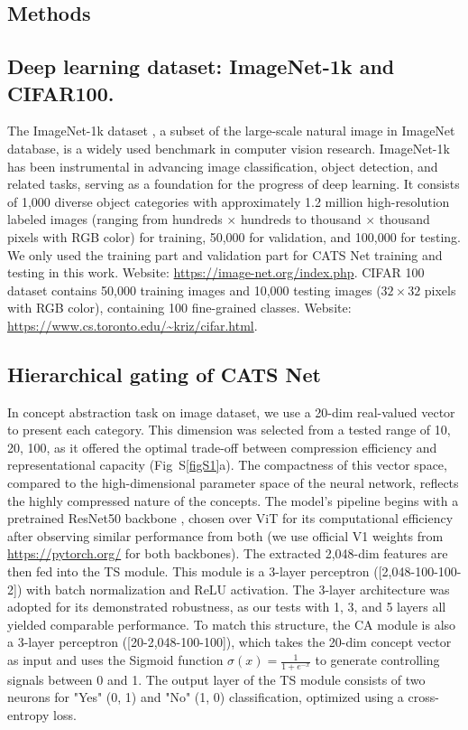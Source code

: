 \documentclass[pdflatex,sn-mathphys-num,lineno]{sn-jnl}%
\begin{document}
\begin{CJK}{UTF8}{gbsn}
\section{Methods}
\subsection{Deep learning dataset: ImageNet-1k and CIFAR100.} The ImageNet-1k dataset \cite{deng_imagenet_2009}, a subset of the large-scale natural image in ImageNet database, is a widely used benchmark in computer vision research. ImageNet-1k has been instrumental in advancing image classification, object detection, and related tasks, serving as a foundation for the progress of deep learning. It consists of 1,000 diverse object categories with approximately 1.2 million high-resolution labeled images (ranging from hundreds $\times$ hundreds to thousand $\times$ thousand pixels with RGB color) for training, 50,000 for validation, and 100,000 for testing. We only used the training part and validation part for CATS Net training and testing in this work. Website: \url{https://image-net.org/index.php}. CIFAR 100 dataset \cite{krizhevsky_learning_2009} contains 50,000 training images and 10,000 testing images ($32\times32$ pixels with RGB color), containing 100 fine-grained classes. Website: \url{https://www.cs.toronto.edu/~kriz/cifar.html}.

\subsection{Hierarchical gating of CATS Net}
In concept abstraction task on image dataset, we use a 20-dim real-valued vector to present each category. This dimension was selected from a tested range of {10, 20, 100}, as it offered the optimal trade-off between compression efficiency and representational capacity (Fig~S\ref{figS1}a). The compactness of this vector space, compared to the high-dimensional parameter space of the neural network, reflects the highly compressed nature of the concepts. The model's pipeline begins with a pretrained ResNet50 backbone \cite{he_deep_2016}, chosen over ViT \cite{dosovitskiy_image_2021} for its computational efficiency after observing similar performance from both (we use official V1 weights from \url{https://pytorch.org/} for both backbones). The extracted 2,048-dim features are then fed into the TS module. This module is a 3-layer perceptron ([2,048-100-100-2]) with batch normalization and ReLU activation. The 3-layer architecture was adopted for its demonstrated robustness, as our tests with 1, 3, and 5 layers all yielded comparable performance. To match this structure, the CA module is also a 3-layer perceptron ([20-2,048-100-100]), which takes the 20-dim concept vector as input and uses the Sigmoid function $\sigma(x) = \frac{1}{1 + e^{-x}}$ to generate controlling signals between 0 and 1. The output layer of the TS module consists of two neurons for "Yes" (0, 1) and "No" (1, 0) classification, optimized using a cross-entropy loss. 


\end{CJK}
\end{document}
